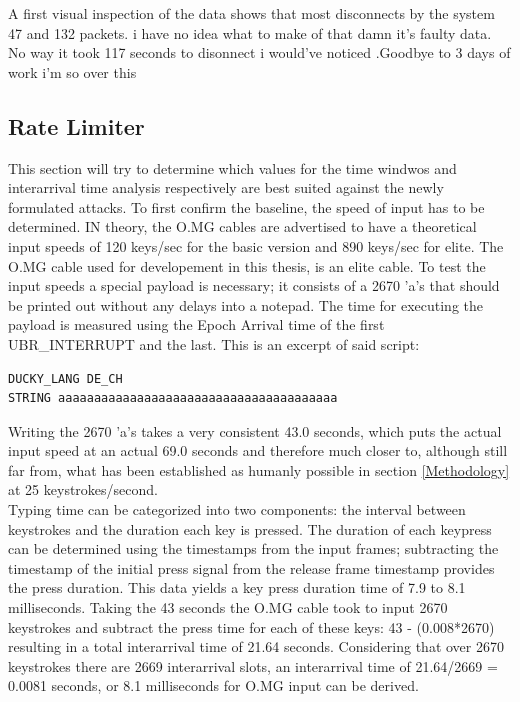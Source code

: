 A first visual inspection of the data shows that most disconnects by the system 47 and 132 packets. i have no idea what to make of that damn it's faulty data. No way it took 117 seconds to disonnect i would've noticed .Goodbye to 3 days of work i'm so over this




\subsection{Rate Limiter}

This section will try to determine which values for the time windwos and interarrival time analysis respectively are best suited against the newly formulated attacks. To first confirm the baseline, the speed of input has to be determined. IN theory, the O.MG cables are advertised to have a theoretical input speeds of 120 keys/sec for the basic version and 890 keys/sec for elite. The O.MG cable used for developement in this thesis, is an elite cable. To test the input speeds a special payload is necessary; it consists of a 2670 'a's that should be printed out without any delays into a notepad. The time for executing the payload is measured using the Epoch Arrival time of the first UBR_INTERRUPT and the last. 
This is an excerpt of said script:

\begin{lstlisting}[caption={Excerpt: write 2670 'a's without delays},label=lst:a_spam, captionpos=b]
DUCKY_LANG DE_CH
STRING aaaaaaaaaaaaaaaaaaaaaaaaaaaaaaaaaaaaaaa
\end{lstlisting}

Writing the 2670 'a's takes a very consistent 43.0 seconds, which puts the actual input speed at an actual 69.0 seconds and therefore much closer to, although still far from, what has been established as humanly possible in section \ref{Methodology} at 25 keystrokes/second. \\
Typing time can be categorized into two components: the interval between keystrokes and the duration each key is pressed. The duration of each keypress can be determined using the timestamps from the input frames; subtracting the timestamp of the initial press signal from the release frame timestamp provides the press duration. This data yields a key press duration time of 7.9 to 8.1 milliseconds. Taking the 43 seconds the O.MG cable took to input 2670 keystrokes and subtract the press time for each of these keys: 43 - (0.008*2670) resulting in a total interarrival time of 21.64 seconds. Considering that over 2670 keystrokes there are 2669 interarrival slots, an interarrival time of 21.64/2669 = 0.0081 seconds, or 8.1 milliseconds for O.MG input can be derived. 

